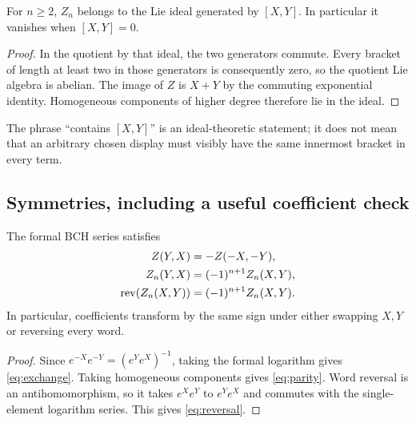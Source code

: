 \begin{corollary}\label{cor:comm-ideal}
For $n\geq2$, $Z_n$ belongs to the Lie ideal generated by $[X,Y]$. In particular it vanishes when $[X,Y]=0$.
\end{corollary}
\begin{proof}
In the quotient by that ideal, the two generators commute. Every bracket of length at least two in those generators is consequently zero, so the quotient Lie algebra is abelian. The image of $Z$ is $X+Y$ by the commuting exponential identity. Homogeneous components of higher degree therefore lie in the ideal.
\end{proof}
The phrase ``contains $[X,Y]$'' is an ideal-theoretic statement; it does not mean that an arbitrary chosen display must visibly have the same innermost bracket in every term.

\subsection{Symmetries, including a useful coefficient check}
\begin{proposition}\label{prop:symmetry}
The formal BCH series satisfies
\begin{align}
 Z(Y,X)&=-Z(-X,-Y),\label{eq:exchange}\\
 Z_n(Y,X)&=(-1)^{n+1}Z_n(X,Y),\label{eq:parity}\\
 \operatorname{rev}(Z_n(X,Y))&=(-1)^{n+1}Z_n(X,Y).\label{eq:reversal}
\end{align}
In particular, coefficients transform by the same sign under either swapping $X,Y$ or reversing every word.
\end{proposition}
\begin{proof}
Since $e^{-X}e^{-Y}=(e^Ye^X)^{-1}$, taking the formal logarithm gives \cref{eq:exchange}. Taking homogeneous components gives \cref{eq:parity}. Word reversal is an antihomomorphism, so it takes $e^Xe^Y$ to $e^Ye^X$ and commutes with the single-element logarithm series. This gives \cref{eq:reversal}.
\end{proof}

